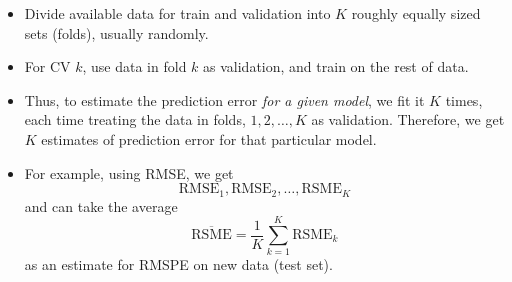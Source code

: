 \begin{itemize}
\begin{figure}[!ht]
            \end{figure}
            \begin{itemize}
                  \item Divide available data for train and validation
                        into $ K $ roughly equally sized sets (folds),
                        usually randomly.
                  \item For CV $ k $, use data in fold $ k $
                        as validation, and train on
                        the rest of data.
                  \item Thus, to estimate the prediction error
                        \emph{for a given model}, we fit it $ K $ times, each
                        time treating the data in folds, $ 1,2,\ldots,K $
                        as validation.
                        Therefore, we get $ K $ estimates of prediction error
                        for that particular model.
                  \item For example, using RMSE, we get
                        \[ \text{RMSE}_1,\text{RMSE}_2,\ldots,\text{RSME}_K \]
                        and can take the average
                        \[ \overline{\text{RSME}}=\frac{1}{K} \sum_{k=1}^{K}\text{RSME}_k \]
                        as an estimate for RMSPE on new data (test set).
            \end{itemize}
\end{itemize}
